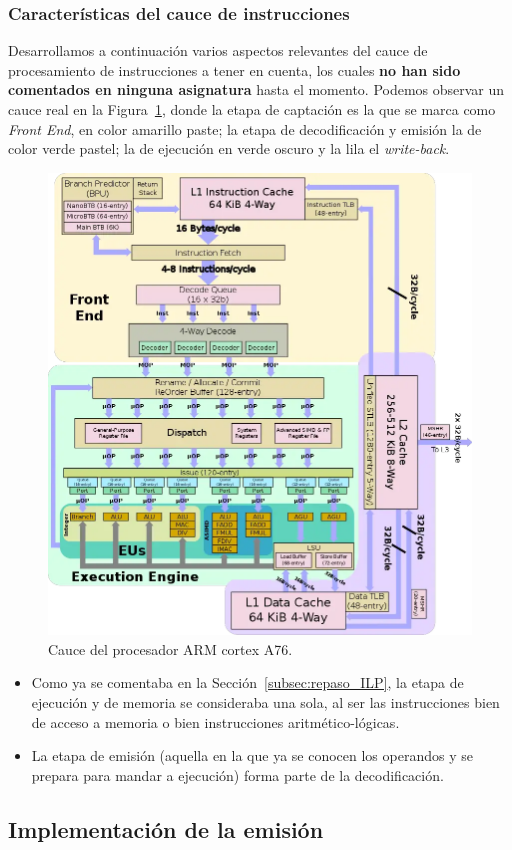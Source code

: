 \subsubsection{Características del cauce de instrucciones}
Desarrollamos a continuación varios aspectos relevantes del cauce de procesamiento de instrucciones a tener en cuenta, los cuales \textbf{no han sido comentados en ninguna asignatura} hasta el momento. Podemos observar un cauce real en la Figura~\ref{fig:Cauce_ARM_cortex_a76}, donde la etapa de captación es la que se marca como \emph{Front End}, en color amarillo paste; la etapa de decodificación y emisión la de color verde pastel; la de ejecución en verde oscuro y la lila el \emph{write-back}.

\begin{figure}
    \centering
    \includegraphics[width=0.8\linewidth]{Images/Cauce1.png}
    \caption{Cauce del procesador ARM cortex A76.}
    \label{fig:Cauce_ARM_cortex_a76}
\end{figure}

\begin{itemize}
    \item Como ya se comentaba en la Sección~\ref{subsec:repaso_ILP}, la etapa de ejecución y de memoria se consideraba una sola, al ser las instrucciones bien de acceso a memoria o bien instrucciones aritmético-lógicas.
    \item La etapa de emisión (aquella en la que ya se conocen los operandos y se prepara para mandar a ejecución) forma parte de la decodificación.
\end{itemize}

\subsection{Implementación de la emisión}
